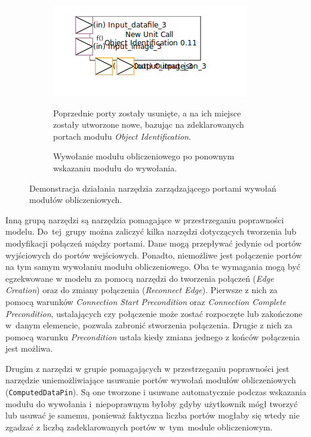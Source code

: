 \begin{figure}
\begin{subfigure}{.3\textwidth}
		\centering
		\includegraphics[width=.99\linewidth]{./images/sirius-desktop-change-unit-to-call-after.png}
		\caption{Wywołanie modułu obliczeniowego po ponownym wskazaniu modułu do wywołania.}\label{
      rys:sirius-desktop-change-unit-to-call-after}
    \medskip
    {\small Poprzednie porty zostały usunięte, a na ich miejsce zostały
      utworzone nowe, bazując na zdeklarowanych portach modułu \emph{Object
      Identification}.}
	\end{subfigure}

	\caption{Demonstracja działania narzędzia zarządzającego portami wywołań
    modułów obliczeniowych.}\label{rys:sirius-desktop-change-unit-to-call}
\end{figure}

Inną grupą narzędzi są narzędzia pomagające w przestrzeganiu poprawności
modelu. Do~tej~grupy można zaliczyć kilka narzędzi dotyczących tworzenia lub
modyfikacji połączeń między portami. Dane mogą przepływać jedynie od portów
wyjściowych do portów wejściowych. Ponadto, niemożliwe jest połączenie portów
na tym samym wywołaniu modułu obliczeniowego. Oba te wymagania mogą być
egzekwowane w modelu za pomocą narzędzi do tworzenia połączeń (\emph{Edge
	Creation}) oraz do zmiany połączenia (\emph{Reconnect Edge}). Pierwsze
z nich za
pomocą warunków \emph{Connection Start Precondition} oraz
\emph{Connection Complete Precondition}, ustalających czy połączenie może
zostać
rozpoczęte lub zakończone w~danym elemencie, pozwala zabronić stworzenia
połączenia. Drugie z nich za pomocą warunku \emph{Precondition} ustala kiedy
zmiana jednego z końców połączenia jest możliwa.

Drugim z narzędzi w grupie pomagających w przestrzeganiu poprawności jest
narzędzie uniemożliwiające usuwanie portów wywołań modułów obliczeniowych
(\texttt{ComputedDataPin}). Są one tworzone i usuwane automatycznie podczas
wskazania modułu do wywołania i~niepoprawnym byłoby gdyby użytkownik mógł
tworzyć lub usuwać je samemu, ponieważ faktyczna liczba portów mogłaby się
wtedy nie
zgadzać z liczbą zadeklarowanych portów w~tym~module obliczeniowym.

